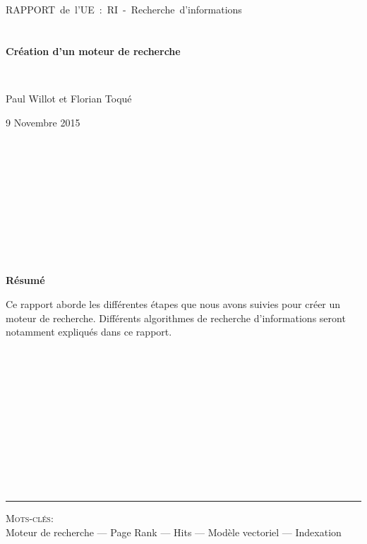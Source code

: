 \documentclass[a4paper,11pt]{report}
\begin{document}
~\\\\\\\\\\
\begin{center}
\mbox{\huge RAPPORT de l'UE : RI - Recherche d'informations}\\~\\ \mbox{ }\\ \textbf{\LARGE Création d'un moteur de recherche}
\end{center}~\\
\begin{center}\large Paul Willot et Florian Toqué\end{center}
\begin{center}\large 9 Novembre 2015 \end{center}~\\\\\\\\\\\\\\\\\
\begin{center}\textbf{\Large{Résumé}}\end{center}
\large{Ce rapport aborde les différentes étapes que nous avons suivies pour créer un moteur de recherche. Différents algorithmes de recherche d'informations seront notamment expliqués dans ce rapport.}\\\\\\\\\\\\\\\\\\\\\\\\
\rule{\linewidth}{.5pt}
\textsc{Mots-clés:}\\
Moteur de recherche --- Page Rank --- Hits --- Modèle vectoriel --- Indexation\\\\\\



\newpage
\tableofcontents
\end{document}
